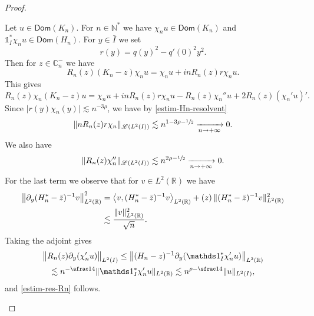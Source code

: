 \documentclass[JEP,XML,SOM,Unicode]{cedram}
\let\mathcal\mathscr
\theoremstyle{plain}
\theoremstyle{definition}
\newcommand {\limt}[2]{\xrightarrow[#1 \to #2]{}}
\newcommand{\abs}[1]{\vert #1\vert}
\newcommand{\nr}[1]{\Vert #1\Vert}
\newcommand{\bnr}[1]{\bigl\Vert #1\bigr\Vert}
\newcommand{\binnp}[2]{\bigl\langle #1 , #2 \bigr\rangle}
\newcommand{\inv}{^{-1}}
\newcommand{\1}{\mathds 1}
\let\Re\relax
\DeclareMathOperator{\Re}{\mathsf{Re}\mkern2mu}
\newcommand{\Dom}{\mathsf{Dom}}
\newcommand{\R}{\mathbb{R}}
\def\C{\mathbb{C}}
\newcommand{\N}{\mathbb{N}}
\let\h\chi
\newcommand{\Lc}{{\mathcal L}}
\begin{document}
\begin{proof}
\begin{itemize}
Let $u \in \Dom(K_n)$. For $n \in \N^*$ we have $\chi_n u \in \Dom(K_n)$ and $\1_I^* \chi_n u \in \Dom(H_n)$. For $y \in \bar I$ we set
\[
r(y) = q(y)^2 - q'(0)^2 y^2.
\]
Then for $z \in \C_n^-$ we have
\[
R_n(z) (K_n-z) \chi_n u = \chi_n u + i n R_n(z) r \chi_n u.
\]
This gives
\begin{equation} \label{eq-K-Rn}
R_n(z) \chi_n (K_n-z) u = \chi_n u + i n R_n(z) r \chi_n u - R_n(z) \chi_n'' u + 2 R_n(z) (\chi_n' u)'.
\end{equation}
Since $\abs{r(y) \h_n(y)} \lesssim n^{-3\rho}$, we have by \eqref{estim-Hn-resolvent}
\begin{equation*}
\nr{n R_n(z) r \h_n}_{\Lc(L^2(I))} \lesssim n^{1 - 3\rho - \sfrac 12} \limt n {+\infty} 0.
\end{equation*}
We also have
\[
\nr{R_n(z) \chi_n''}_{\Lc(L^2(I))} \lesssim n^{2\rho - \sfrac 12} \limt n {+\infty} 0.
\]
For the last term we observe that for $v \in L^2(\R)$ we have
\begin{align*}
\bnr{\partial_y (H_n^*-\bar z)\inv v}_{L^2(\R)}^2
& = \Re \binnp{v}{(H_n^*-\bar z)\inv v}_{L^2(\R)} + \Re(z)\, \nr{(H_n^*-\bar z)\inv v}_{L^2(\R)}^2\\
& \lesssim \frac {\nr{v}_{L^2(\R)}^2}{\sqrt n}.
\end{align*}
Taking the adjoint gives
\begin{multline*}
\bnr{R_n(z) \partial_y (\chi_n' u)}_{L^2(I)} \leq \bnr{(H_n-z)\inv \partial_y (\1_I^* \h_n' u)}_{L^2(\R)}\\
\lesssim n^{-\sfrac 14} \nr{\1_I^* \chi_n'u}_{L^2(\R)} \lesssim n^{\rho-\sfrac 14} \nr{u}_{L^2(I)},
\end{multline*}
and \eqref{estim-res-Rn} follows.


\end{itemize}
\end{proof}
\end{document}
